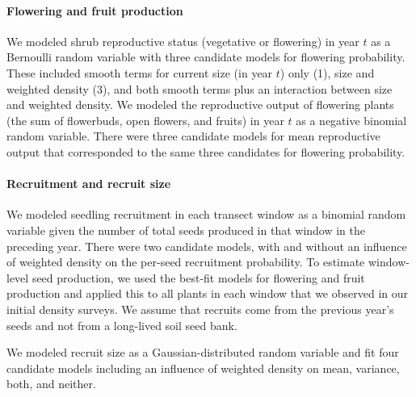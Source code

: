 \documentclass[11pt]{article}\usepackage[]{graphicx}\usepackage[usenames,dvipsnames]{xcolor}
\begin{document}

\paragraph{Flowering and fruit production}
We modeled shrub reproductive status (vegetative or flowering) in year $t$ as a Bernoulli random variable with three candidate models for flowering probability.
These included smooth terms for current size (in year $t$) only (1), size and weighted density (3), and both smooth terms plus an interaction between size and weighted density. 
We modeled the reproductive output of flowering plants (the sum of flowerbuds, open flowers, and fruits) in year $t$ as a negative binomial random variable. 
There were three candidate models for mean reproductive output that corresponded to the same three candidates for flowering probability. 

\paragraph{Recruitment and recruit size}
We modeled seedling recruitment in each transect window as a binomial random variable given the number of total seeds produced in that window in the preceding year. 
There were two candidate models, with and without an influence of weighted density on the per-seed recruitment probability. 
To estimate window-level seed production, we used the best-fit models for flowering and fruit production and applied this to all plants in each window that we observed in our initial density surveys. 
We assume that recruits come from the previous year's seeds and not from a long-lived soil seed bank. 

We modeled recruit size as a Gaussian-distributed random variable and fit four candidate models including an influence of weighted density on mean, variance, both, and neither. 
\end{document}
